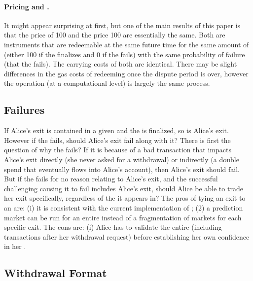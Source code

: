 \paragraph{Pricing \final and \fail.}

It might appear surprising at first, but one of the main results of this paper is that the price of 100 \ethxx and the price 100 \fail are essentially the same. Both are instruments that are redeemable at the same future time for the same amount of \ethone (either 100 if the \rblock finalizes and 0 if the \rblock fails) with the same probability of failure (that the \rblock fails). The carrying costs of both are identical. There may be slight differences in the gas costs of redeeming \ethone once the dispute period is over, however the operation (at a computational level) is largely the same process. 


\subsection{\rblock Failures}

If Alice's exit is contained in a given \rblock and the \rblock is finalized, so is Alice's exit. However if the \rblock fails, should Alice's exit fail along with it? There is first the question of why the \rblock fails? If it is because of a bad transaction that impacts Alice's exit directly (\eg she never asked for a withdrawal) or indirectly (\eg a double spend that eventually flows into Alice's account), then Alice's exit should fail. But if the \rblock fails for no reason relating to Alice's exit, and the successful challenging \rblock causing it to fail includes Alice's exit, should Alice be able to trade her exit specifically, regardless of the \rblock it appears in? The pros of tying an exit to an \rblock are: (i) it is consistent with the current implementation of \arb; (2) a prediction market can be run for an entire \rblock instead of a fragmentation of markets for each specific exit. The cons are: (i) Alice has to validate the entire \rblock (including transactions after her withdrawal request) before establishing her own confidence in her \ethxx. 

\subsection{Withdrawal Format}

